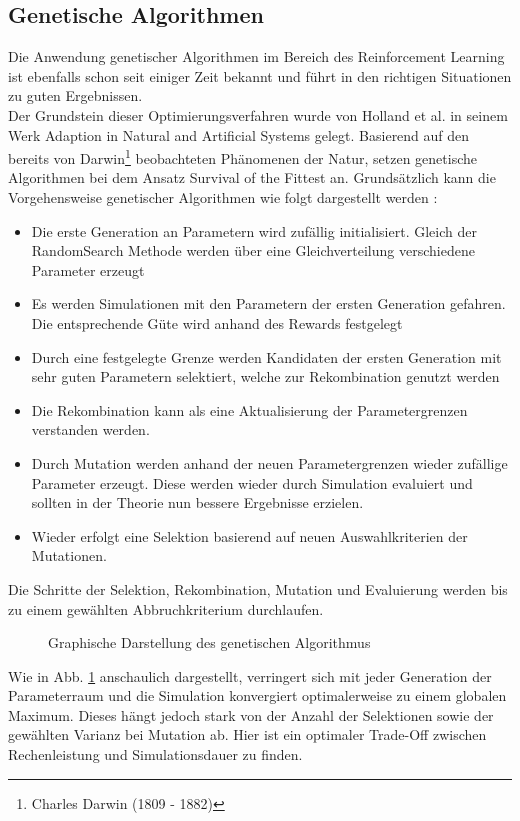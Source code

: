 	\subsection{Genetische Algorithmen}
		Die Anwendung genetischer Algorithmen im Bereich des Reinforcement Learning ist ebenfalls schon seit einiger Zeit bekannt und führt in den richtigen Situationen zu guten Ergebnissen.\\
		Der Grundstein dieser Optimierungsverfahren wurde von Holland et al. in seinem Werk \glqq Adaption in Natural and Artificial Systems\grqq{} \cite{Holland1992} gelegt. Basierend auf den bereits von Darwin\footnote{Charles Darwin (1809 - 1882)} beobachteten Phänomenen der Natur, setzen genetische Algorithmen bei dem Ansatz \glqq Survival of the Fittest\grqq{} an. Grundsätzlich kann die Vorgehensweise genetischer Algorithmen wie folgt dargestellt werden \cite{Goldberg1989}:
		\begin{itemize}
			\item Die erste Generation an Parametern wird zufällig initialisiert. Gleich der RandomSearch Methode werden über eine Gleichverteilung verschiedene Parameter erzeugt
			\item Es werden Simulationen mit den Parametern der ersten Generation gefahren. Die entsprechende Güte wird anhand des Rewards festgelegt
			\item Durch eine festgelegte Grenze werden Kandidaten der ersten Generation mit sehr guten Parametern selektiert, welche zur Rekombination genutzt werden
			\item Die Rekombination kann als eine Aktualisierung der Parametergrenzen verstanden werden.
			\item Durch Mutation werden anhand der neuen Parametergrenzen wieder zufällige Parameter erzeugt. Diese werden wieder durch Simulation evaluiert und sollten in der Theorie nun bessere Ergebnisse erzielen.
			\item Wieder erfolgt eine Selektion basierend auf neuen Auswahlkriterien der Mutationen.
		\end{itemize}
		Die Schritte der Selektion, Rekombination, Mutation und Evaluierung werden bis zu einem gewählten Abbruchkriterium durchlaufen.
		\begin{figure}[H] %
			\centering
			\def\svgwidth{12cm}
			
			\caption{Graphische Darstellung des genetischen Algorithmus}
			\label{fig:gen_chart}
		\end{figure}
		Wie in Abb. \ref{fig:gen_chart} anschaulich dargestellt, verringert sich mit jeder Generation der Parameterraum und die Simulation konvergiert optimalerweise zu einem globalen Maximum. Dieses hängt jedoch stark von der Anzahl der Selektionen sowie der gewählten Varianz bei Mutation ab. Hier ist ein optimaler Trade-Off zwischen Rechenleistung und Simulationsdauer zu finden.
